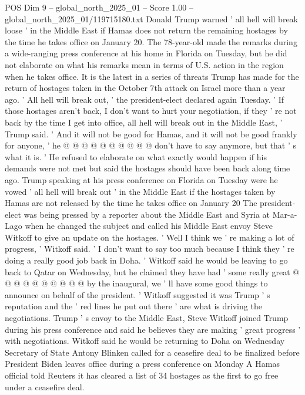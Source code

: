 \begin{textsample}{POS Dim 9 – global\_north\_2025\_01 – Score 1.00 – global\_north\_2025\_01/119715180.txt}  \label{ex:f9_pos_359}
Donald Trump warned ' all hell will break loose ' in the Middle East if Hamas does not return the remaining hostages by the time he takes office on January 20.
The 78-year-old made the remarks during a wide-ranging press conference at his home in Florida on Tuesday, but he did not elaborate on what his remarks mean in terms of U.S. action in the region when he takes office.
It is the latest in a series of threats Trump has made for the return of hostages taken in the October 7th attack on Israel more than a year ago. ' All hell will break out, ' the president-elect declared again Tuesday. ' If those hostages aren't back, I don't want to hurt your negotiation, if they ' re not back by the time I get into office, all hell will break out in the Middle East, ' Trump said. ' And it will not be good for Hamas, and it will not be good frankly for anyone, ' he @ @ @ @ @ @ @ @ @ @ don't have to say anymore, but that ' s what it is. ' He refused to elaborate on what exactly would happen if his demands were not met but said the hostages should have been back along time ago.
Trump speaking at his press conference on Florida on Tuesday were he vowed ' all hell will break out ' in the Middle East if the hostages taken by Hamas are not released by the time he takes office on January 20 The president-elect was being pressed by a reporter about the Middle East and Syria at Mar-a-Lago when he changed the subject and called his Middle East envoy Steve Witkoff to give an update on the hostages. ' Well I think we ' re making a lot of progress, ' Witkoff said. ' I don't want to say too much because I think they ' re doing a really good job back in Doha. ' Witkoff said he would be leaving to go back to Qatar on Wednesday, but he claimed they have had ' some really great @ @ @ @ @ @ @ @ @ @ by the inaugural, we ' ll have some good things to announce on behalf of the president. ' Witkoff suggested it was Trump ' s reputation and the ' red lines he put out there ' are what is driving the negotiations.
Trump ' s envoy to the Middle East, Steve Witkoff joined Trump during his press conference and said he believes they are making ' great progress ' with negotiations.
Witkoff said he would be returning to Doha on Wednesday Secretary of State Antony Blinken called for a ceasefire deal to be finalized before President Biden leaves office during a press conference on Monday A Hamas official told Reuters it has cleared a list of 34 hostages as the first to go free under a ceasefire deal.

\end{textsample}
